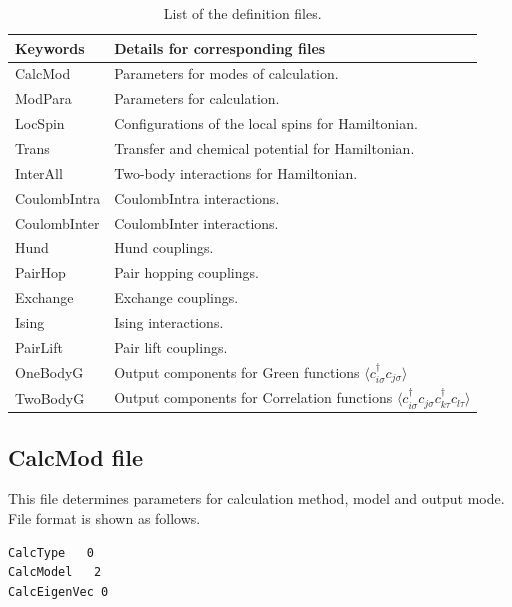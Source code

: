  \begin{table}[h!]
\begin{center}
  \begin{tabular}{ll|} \hline
           Keywords     & Details for corresponding files       \\   \hline\hline
           CalcMod      &   Parameters for modes of calculation.  \\  \hline  
           ModPara       &  Parameters for calculation.        \\ \hline   
           LocSpin         &  Configurations of the local spins for Hamiltonian.         \\ 
           Trans       &   Transfer and chemical potential for Hamiltonian.  \\
           InterAll  &   Two-body interactions for Hamiltonian. \\  
           CoulombIntra  &   CoulombIntra interactions. \\  
           CoulombInter  &   CoulombInter  interactions. \\  
           Hund  &   Hund couplings. \\  
           PairHop  &  Pair hopping couplings. \\  
           Exchange  &  Exchange couplings. \\  
           Ising  &  Ising interactions. \\  
           PairLift  &   Pair lift couplings. \\  
           OneBodyG         &   Output components for Green functions $\langle c_{i\sigma}^{\dagger}c_{j\sigma}\rangle$           \\   
           TwoBodyG &   Output components for Correlation functions $\langle c_{i\sigma}^{\dagger}c_{j\sigma}c_{k\tau}^{\dagger}c_{l\tau}\rangle$  \\   \hline
  \end{tabular}
\end{center}
\caption{List of the definition files.}
\label{Table:Defs}
\end{table}%

\newpage
\subsection{CalcMod file}
\label{Subsec:calcmod}
This file determines parameters for calculation method, model and output mode. File format is shown as follows.\\
\begin{minipage}{10cm}
\begin{screen}
\begin{verbatim}
CalcType   0
CalcModel   2
CalcEigenVec 0
\end{verbatim}
\end{screen}
\end{minipage}
\\
